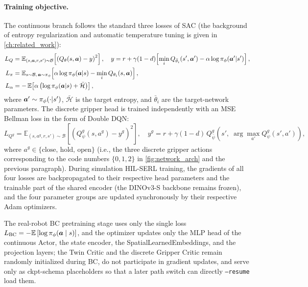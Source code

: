 \paragraph{Training objective.} The continuous branch follows the standard three losses of SAC (the background of entropy regularization and automatic temperature tuning is given in \cref{ch:related_work}):
\begin{align*}
  L_Q &= \mathbb{E}_{(s,\bm{a},r,s')\sim\mathcal{B}}\!\left[\left(Q_\theta(s,\bm{a}) - y\right)^2\right], \quad y = r + \gamma(1-d)\!\left[\min_i Q_{\bar{\theta}_i}(s', \bm{a}') - \alpha \log \pi_\phi(\bm{a}'|s')\right], \\
  L_\pi &= \mathbb{E}_{s\sim\mathcal{B},\, \bm{a}\sim\pi_\phi}\!\left[\alpha \log \pi_\phi(\bm{a}|s) - \min_i Q_{\theta_i}(s, \bm{a})\right], \\
  L_\alpha &= -\,\mathbb{E}\!\left[\alpha\left(\log \pi_\phi(\bm{a}|s) + \bar{\mathcal{H}}\right)\right],
\end{align*}
where $\bm{a}' \sim \pi_\phi(\cdot|s')$, $\bar{\mathcal{H}}$ is the target entropy, and $\bar{\theta}_i$ are the target-network parameters. The discrete gripper head is trained independently with an MSE Bellman loss in the form of Double DQN:
\begin{equation*}
  L_{Q^g} = \mathbb{E}_{(s, a^g, r, s')\sim\mathcal{B}}\!\left[\left(Q^g_\psi(s, a^g) - y^g\right)^2\right], \quad y^g = r + \gamma(1-d)\, Q^g_{\bar{\psi}}\!\left(s',\; \arg\max_{a'} Q^g_\psi(s', a')\right),
\end{equation*}
where $a^g \in \{\text{close},\, \text{hold},\, \text{open}\}$ (i.e., the three discrete gripper actions corresponding to the code numbers $\{0, 1, 2\}$ in \cref{fig:network_arch} and the previous paragraph). During simulation HIL-SERL training, the gradients of all four losses are backpropagated to their respective head parameters and the trainable part of the shared encoder (the DINOv3-S backbone remains frozen), and the four parameter groups are updated synchronously by their respective Adam optimizers.

The real-robot BC pretraining stage uses only the single loss $L_\text{BC} = -\mathbb{E}\left[\log \pi_\phi(\bm{a}\mid s)\right]$, and the optimizer updates only the MLP head of the continuous Actor, the state encoder, the SpatialLearnedEmbeddings, and the projection layers; the Twin Critic and the discrete Gripper Critic remain randomly initialized during BC, do not participate in gradient updates, and serve only as ckpt-schema placeholders so that a later path switch can directly \texttt{--resume} load them.

